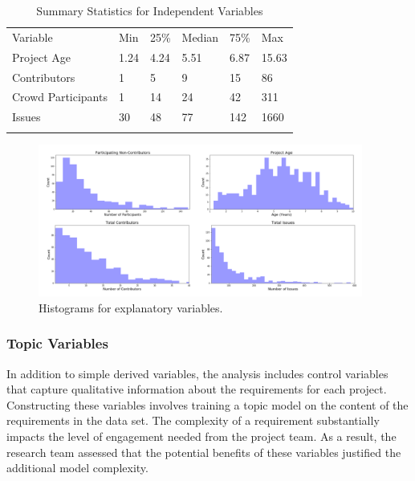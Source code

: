 \begin{table}
\caption{Summary Statistics for Independent Variables}
\label{iv_summary}
\begin{tabular}{llllll}
\hline\noalign{\smallskip}
Variable & Min & 25\% & Median & 75\% & Max  \\
\noalign{\smallskip}\hline\noalign{\smallskip}
Project Age & 1.24 & 4.24  & 5.51 & 6.87 & 15.63 \\
Contributors & 1 & 5 & 9 & 15 & 86 \\
Crowd Participants & 1 & 14 & 24 & 42 & 311 \\
Issues & 30 & 48 & 77 & 142 & 1660 \\
\noalign{\smallskip}\hline
\end{tabular}
\end{table}

\begin{figure}
  \includegraphics[width=0.95\textwidth]{feature_histograms.PNG}
\caption{Histograms for explanatory variables.}
\label{feature_histograms}
\end{figure}

\subsubsection{Topic Variables}
\label{topic_modeling}

In addition to simple derived variables, the analysis includes control variables that capture qualitative information about the requirements for each project. Constructing these variables involves training a topic model on the content of the requirements in the data set. The complexity of a requirement substantially impacts the level of engagement needed from the project team. As a result, the research team assessed that the potential benefits of these variables justified the additional model complexity.

